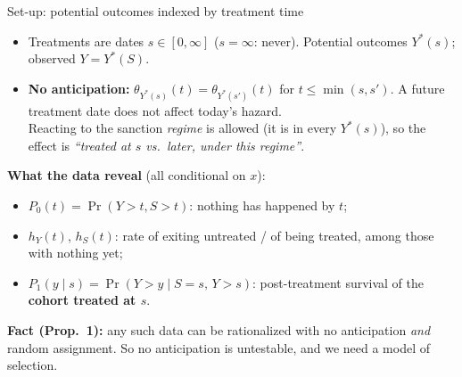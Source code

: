 \documentclass[aspectratio=169,10pt]{beamer}
\newcommand{\1}{\mathbf{1}}
\begin{document}
\begin{frame}{Set-up: potential outcomes indexed by treatment time}
  \begin{itemize}
    \item Treatments are dates $s\in[0,\infty]$ ($s=\infty$: never). Potential outcomes $Y^*(s)$; observed $Y=Y^*(S)$.
    \item \textbf{No anticipation:} $\theta_{Y^*(s)}(t)=\theta_{Y^*(s')}(t)$ for $t\le\min(s,s')$. A future treatment date does not affect today's hazard.\\
      Reacting to the sanction \emph{regime} is allowed (it is in every $Y^*(s)$), so the effect is \emph{``treated at $s$ vs.\ later, under this regime''}.
  \end{itemize}
  \begin{center}
  \end{center}
  \textbf{What the data reveal} (all conditional on $x$):
  \begin{itemize}
    \item $P_0(t)=\Pr(Y>t,S>t)$: nothing has happened by $t$;
    \item $h_Y(t)$, $h_S(t)$: rate of exiting untreated / of being treated, among those with nothing yet;
    \item $P_1(y\mid s)=\Pr(Y>y\mid S=s,\,Y>s)$: post-treatment survival of the \textbf{cohort treated at $s$}.
  \end{itemize}
  \textbf{Fact (Prop.~1):} any such data can be rationalized with no anticipation \emph{and} random assignment. So no anticipation is untestable, and we need a model of selection.
\end{frame}
\end{document}
